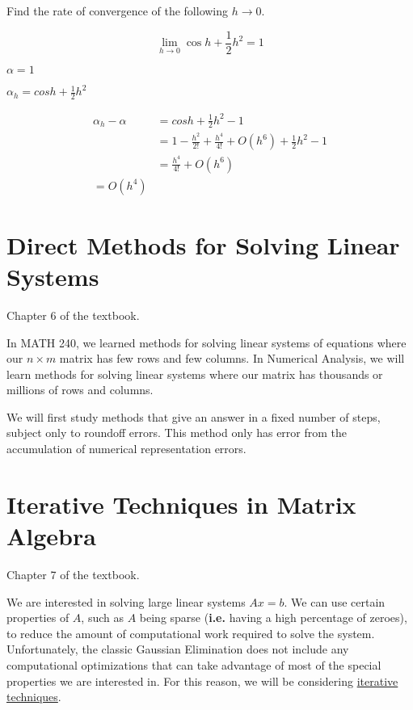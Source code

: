 \documentclass[12pt]{book}
\newcommand{\ie}{\textbf{i.e.}\xspace}
\begin{document}
Find the rate of convergence of the following $h\to 0$.

\begin{equation*}
  \lim_{h \to 0} \cos h + \frac{1}{2} h^2 = 1
\end{equation*}

$\alpha = 1$

$\alpha_h = cos h + \frac{1}{2} h^2$

\begin{align*}
  \alpha_h - \alpha &= cos h + \frac{1}{2} h^2 - 1\\
  &= 1-\frac{h^2}{2!}+\frac{h^4}{4!} + O(h^6) + \frac{1}{2}h^2 - 1 \\
  &= \frac{h^4}{4!} + O(h^6) \\
  = O(h^4)
\end{align*}

\chapter{Direct Methods for Solving Linear Systems}
\begin{greenquote}
  Chapter 6 of the textbook.
\end{greenquote}

In MATH 240, we learned methods for solving linear systems of equations where
our $n \times m$ matrix has few rows and few columns. In Numerical Analysis, we
will learn methods for solving linear systems where our matrix has thousands or
millions of rows and columns.

We will first study methods that give an answer in a fixed number of steps, 
subject only to roundoff errors. This method only has error from the accumulation
of numerical representation errors.







\chapter{Iterative Techniques in Matrix Algebra}
\begin{greenquote}
  Chapter 7 of the textbook.
\end{greenquote}

We are interested in solving large linear systems $Ax = b$. We can use certain
properties of $A$, such as $A$ being sparse (\ie having a high percentage of
zeroes), to reduce the amount of computational work required to solve the
system. Unfortunately, the classic Gaussian Elimination does not include any
computational optimizations that can take advantage of most of the special
properties we are interested in. For this reason, we will be considering
\uline{iterative techniques}.
\end{document}
